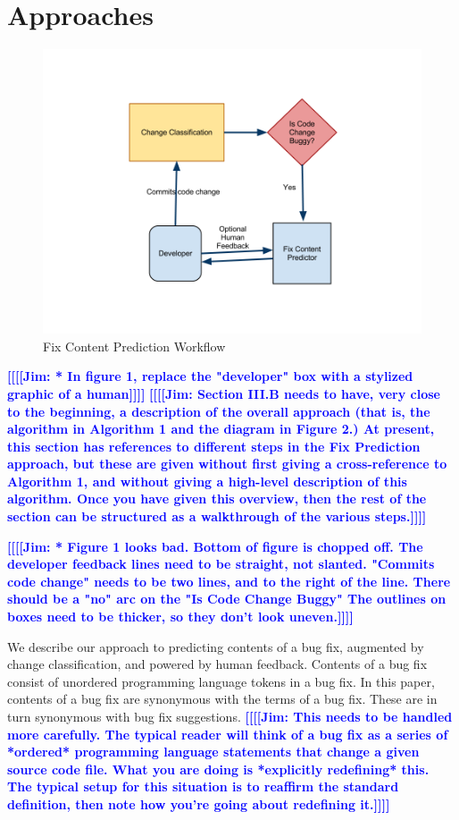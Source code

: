 \documentclass[10pt, conference, letterpaper, compsocconf]{IEEEtran}
\newcommand{\todoc}[2]{{\textcolor{#1} {\textbf{[[#2]]}}}}
\newcommand{\todoblue}[1]{\todoc{blue}{\textbf{[[#1]]}}}
\newcommand{\jim}[1]{\todoblue{Jim: #1}}
\begin{document}
\section{Approaches}
\label{Approaches} 

\begin{figure}[t]
\begin{center}
 \includegraphics[scale=0.3]{pictures/FixPredictionWorkflow.png}
\end{center}
\caption{Fix Content Prediction Workflow}
\label{workflow}
\end{figure}

\jim{* In figure 1, replace the "developer" box with a stylized graphic of a human}
\jim{Section III.B needs to have, very close to the beginning, a description of the overall approach (that is, the algorithm in Algorithm 1 and the diagram in Figure 2.) At present, this section has references to different steps in the Fix Prediction approach, but these are given without first giving a cross-reference to Algorithm 1, and without giving a high-level description of this algorithm. Once you have given this overview, then the rest of the section can be structured as a walkthrough of the various steps.}

\jim{* Figure 1 looks bad. Bottom of figure is chopped off. The developer feedback lines need to be straight, not slanted. "Commits code change" needs to be two lines, and to the right of the line. There should be a "no" arc on the "Is Code Change Buggy" The outlines on boxes need to be thicker, so they don't look uneven.}

We describe our approach to predicting contents of a bug fix, augmented by change classification, and powered by human feedback.
Contents of a bug fix consist of unordered programming language tokens in a bug fix.
In this paper, contents of a bug fix are synonymous with the terms of a bug fix. These are in turn synonymous with bug fix suggestions. \jim{This needs to be handled more carefully. The typical reader will think of a bug fix as a series of *ordered* programming language statements that change a given source code file. What you are doing is *explicitly redefining* this. The typical setup for this situation is to reaffirm the standard definition, then note how you're going about redefining it.}
\end{document}
